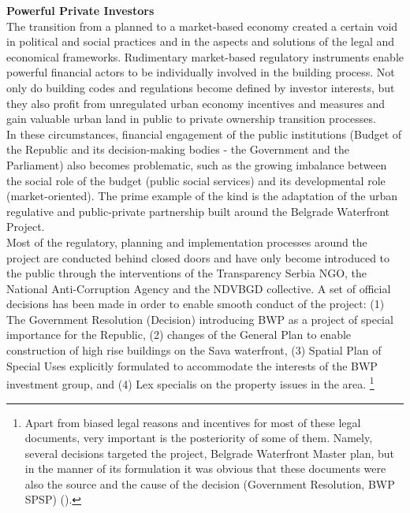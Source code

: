 \documentclass[11pt]{report}
\begin{document}
{{{{\textbf{Powerful Private Investors}
\\
The transition from a planned to a market-based economy created a certain void in political and social practices and in the aspects and solutions of the legal and economical frameworks. Rudimentary market-based regulatory instruments enable powerful financial actors to be individually involved in the building process. Not only do building codes and regulations become defined by investor interests, but they also profit from unregulated urban economy incentives and measures and gain valuable urban land in public to private ownership transition processes.
\\

In these circumstances, financial engagement of the public institutions (Budget of the Republic and its decision-making bodies - the Government and the Parliament) also becomes problematic, such as the growing imbalance between the social role of the budget (public social services) and its developmental role (market-oriented). The prime example of the kind is the adaptation of the urban regulative and public-private partnership built around the Belgrade Waterfront Project.
\\

Most of the regulatory, planning and implementation processes around the project are conducted behind closed doors and have only become introduced to the public through the interventions of the Transparency Serbia NGO, the National Anti-Corruption Agency and the NDVBGD collective. A set of official decisions has been made in order to enable smooth conduct of the project: (1) The Government Resolution (Decision) introducing BWP as a project of special importance for the Republic, (2) changes of the General Plan to enable construction of high rise buildings on the Sava waterfront, (3) Spatial Plan of Special Uses explicitly formulated to accommodate the interests of the BWP investment group, and (4) Lex specialis on the property issues in the area.
\footnote{Apart from biased legal reasons and incentives for most of these legal documents, very important is the posteriority of some of them. Namely, several decisions targeted the project, Belgrade Waterfront Master plan, but in the manner of its formulation it was obvious that these documents were also the source and the cause of the decision (Government Resolution, BWP SPSP) (\href{Izvestaj}{\citealt{pravni_skener_alternativni_2016}}).}
\\

}}}}
\end{document}
